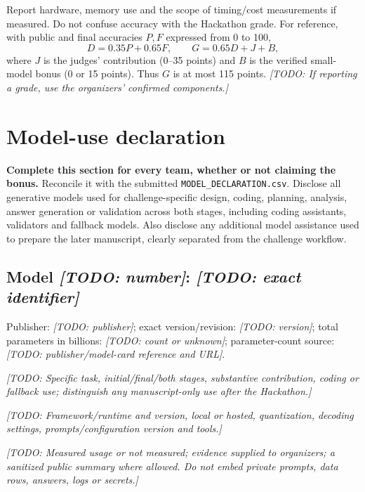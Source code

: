 \documentclass[11pt,a4paper]{article}
\newcommand{\todo}[1]{\textit{[TODO: #1]}}
\begin{document}
Report hardware, memory use and the scope of timing/cost measurements if
measured. Do not confuse accuracy with the Hackathon grade. For reference,
with public and final accuracies $P,F$ expressed from 0 to 100,
\[
 D=0.35P+0.65F,\qquad G=0.65D+J+B,
\]
where $J$ is the judges' contribution (0--35 points) and $B$ is the verified
small-model bonus (0 or 15 points). Thus $G$ is at most 115 points.
\todo{If reporting a grade, use the organizers' confirmed components.}

\section{Model-use declaration}
\textbf{Complete this section for every team, whether or not claiming the
bonus.} Reconcile it with the submitted \texttt{MODEL\_DECLARATION.csv}.
Disclose all generative models used for challenge-specific design, coding,
planning, analysis, answer generation or validation across both stages,
including coding assistants, validators and fallback models. Also disclose
any additional model assistance used to prepare the later manuscript,
clearly separated from the challenge workflow.

\subsection*{Model \todo{number}: \todo{exact identifier}}
\begin{description}[style=nextline]
  \item[Identity and size] Publisher: \todo{publisher}; exact version/revision:
    \todo{version}; total parameters in billions: \todo{count or unknown};
    parameter-count source: \todo{publisher/model-card reference and URL}.
  \item[Role and stage] \todo{Specific task, initial/final/both stages,
    substantive contribution, coding or fallback use; distinguish any
    manuscript-only use after the Hackathon.}
  \item[Configuration] \todo{Framework/runtime and version, local or hosted,
    quantization, decoding settings, prompts/configuration version and tools.}
  \item[Usage and evidence] \todo{Measured usage or not measured;
    evidence supplied to organizers; a sanitized public summary where allowed.
    Do not embed private prompts, data rows, answers, logs or secrets.}
\end{description}
\end{document}

